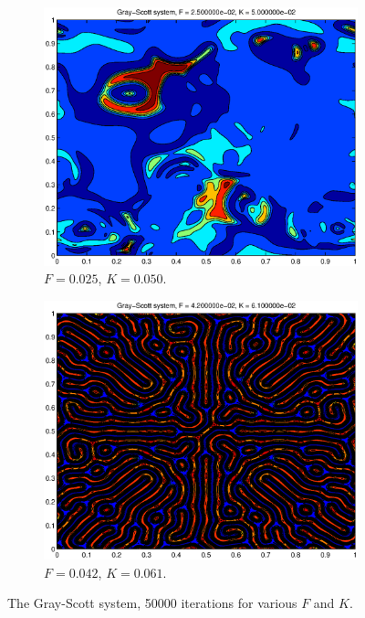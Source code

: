 \documentclass[a4paper,11pt]{article}
\begin{document}
\begin{figure}
\begin{subfigure}[b]{0.48\textwidth}
    \end{subfigure}
      \hfill
    \begin{subfigure}[b]{0.48\textwidth}
        \centering
        \includegraphics[width=\textwidth]{FK2550}
        \caption{$F = 0.025$, $K = 0.050$.}
        \label{fig:FK2550}
    \end{subfigure}
            \hfill
    \begin{subfigure}[b]{0.48\textwidth}
        \centering
        \includegraphics[width=\textwidth]{FK4261}
        \caption{$F = 0.042$, $K = 0.061$.}
        \label{fig:FK4261}
    \end{subfigure}
    \caption{The Gray-Scott system, 50000 iterations for various $F$ and $K$.}
    \label{fig:gray-scott}
\end{figure}
\end{document}
